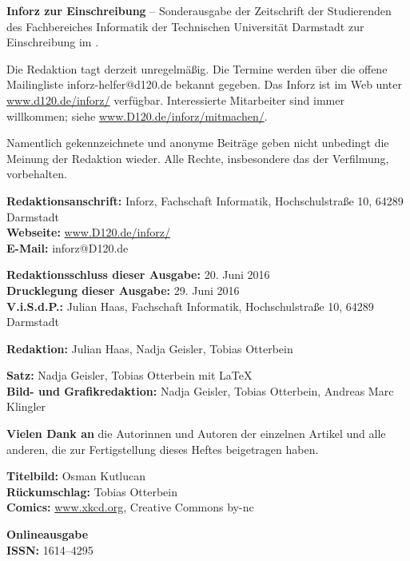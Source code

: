 \small

\textbf{Inforz zur Einschreibung \semester} – Sonderausgabe der Zeitschrift der Studierenden des Fachbereiches Informatik der Technischen Universität Darmstadt zur Einschreibung im \semester.

\vspace{4mm}
Die Redaktion tagt derzeit unregelmäßig. Die Termine werden über die offene Mailingliste inforz-helfer@d120.de bekannt gegeben. Das Inforz ist  im Web unter \url{www.d120.de/inforz/} verfügbar. Interessierte Mitarbeiter sind immer willkommen; siehe  \url{www.D120.de/inforz/mitmachen/}.

\vspace{4mm}
Namentlich gekennzeichnete und anonyme Beiträge geben nicht unbedingt die Meinung der Redaktion wieder. Alle Rechte, insbesondere das der Verfilmung, vorbehalten.


\textbf{Redaktionsanschrift:} Inforz, Fachschaft Informatik, Hochschulstraße 10, 64289 Darmstadt\\
\textbf{Webseite:} \url{www.D120.de/inforz/}\\
\textbf{E-Mail:} inforz@D120.de

\vspace{4mm}
\textbf{Redaktionsschluss dieser Ausgabe:} 20. Juni 2016\\
\textbf{Drucklegung dieser Ausgabe:} 29. Juni 2016\\
\textbf{V.i.S.d.P.:} Julian Haas, Fachschaft Informatik, Hochschulstraße 10, 64289 Darmstadt

\vspace{4mm}
\textbf{Redaktion:} Julian Haas, Nadja Geisler, Tobias Otterbein

\vspace{4mm}
\textbf{Satz:} Nadja Geisler, Tobias Otterbein mit \LaTeX\\
\textbf{Bild- und Grafikredaktion:} Nadja Geisler, Tobias Otterbein,  Andreas Marc Klingler

\vspace{4mm}
\textbf{Vielen Dank an} die Autorinnen und Autoren der einzelnen Artikel und alle anderen, die zur Fertigstellung dieses Heftes beigetragen haben.

\vspace{4mm}
\textbf{Titelbild:} Osman Kutlucan\\
\textbf{Rückumschlag:} Tobias Otterbein\\
\textbf{Comics:} \url{www.xkcd.org}, Creative Commons by-nc

\vspace{4mm}
\textbf{Onlineausgabe}\\
\textbf{ISSN:} 1614–4295

\newpage

